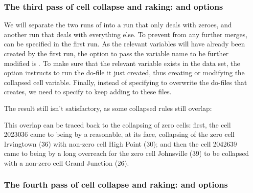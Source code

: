\subsubsection{The third pass of cell collapse and raking:  and  options}

We will separate the two runs of  into a run that only deals with zeroes,
and another run that deals with everything else. To prevent  from any further
merges,  can be specified in the first run. As the relevant variables will have already been
created by the first run, the option to pass the variable name to be further modified is
. To make sure that the relevant variable exists in the data set,
the option  instructs  to run the do-file it just created,
thus creating or modifying the collapsed cell variable.
Finally, instead of specifying  to overwrite the do-files that 
 creates, we need to specify  to keep adding to these files.

\begin{stlog}
\nullskip
\end{stlog}

The result still isn't satisfactory, as some collapsed rules still overlap:

\begin{stlog}
\nullskip
\end{stlog}

This overlap can be traced back to the collapsing of zero cells:
first, the cell 2023036 came to being by a reasonable, at its face, collapsing 
of the zero cell Irvingtown (36) with non-zero cell High Point (30);
and then the cell 2042639 came to being by a long overreach for the zero cell
Johnsville (39) to be collapsed with a non-zero cell Grand Junction (26).

\subsubsection{The fourth pass of cell collapse and raking:  and  options}

